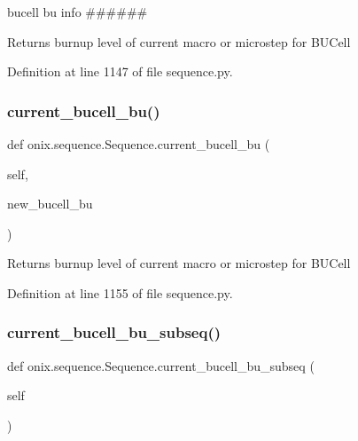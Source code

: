 bucell bu info \#\#\#\#\#\# 

\begin{DoxyVerb}Returns burnup level of current macro or microstep
for BUCell\end{DoxyVerb}
 

Definition at line 1147 of file sequence.\+py.

\mbox{\label{classonix_1_1sequence_1_1Sequence_ad97b33452a77fe96494fb01b210a9fca}} 
\subsubsection{\texorpdfstring{current\+\_\+bucell\+\_\+bu()}{current\_bucell\_bu()}\hspace{0.1cm}{\footnotesize\ttfamily [2/2]}}
{\footnotesize\ttfamily def onix.\+sequence.\+Sequence.\+current\+\_\+bucell\+\_\+bu (\begin{DoxyParamCaption}\item[{}]{self,  }\item[{}]{new\+\_\+bucell\+\_\+bu }\end{DoxyParamCaption})}

\begin{DoxyVerb}Returns burnup level of current macro or microstep
for BUCell\end{DoxyVerb}
 

Definition at line 1155 of file sequence.\+py.

\mbox{\label{classonix_1_1sequence_1_1Sequence_afb32f70bb90d9039d9c6db255d6cb758}} 
\subsubsection{\texorpdfstring{current\+\_\+bucell\+\_\+bu\+\_\+subseq()}{current\_bucell\_bu\_subseq()}}
{\footnotesize\ttfamily def onix.\+sequence.\+Sequence.\+current\+\_\+bucell\+\_\+bu\+\_\+subseq (\begin{DoxyParamCaption}\item[{}]{self }\end{DoxyParamCaption})}

